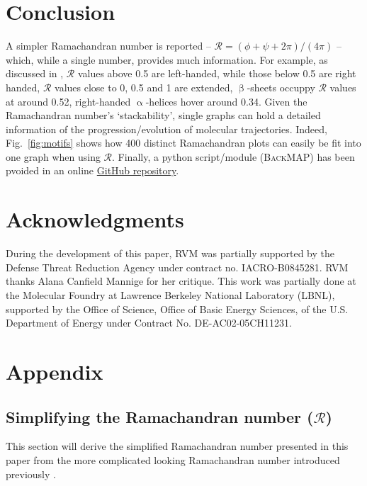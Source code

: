 \documentclass[fleqn,10pt,lineno]{wlpeerj} %
\newcommand{\Fig}[1]{Fig.~\ref{#1}}
\newcommand{\gname}{BackMAP}
\newcommand{\pname}{\textsc{\gname}\xspace}
\newcommand{\rr}{$\mathcal{R}$\xspace}
\begin{document}
\section*{Conclusion}

A simpler Ramachandran number is reported -- $\mathcal{R} = (\phi+\psi+2\pi)/(4\pi)$ -- which, while a single number, provides much information. For example, as discussed in \cite{Mannige2016}, \rr values above 0.5 are left-handed, while those below 0.5 are right handed, \rr values close to 0, 0.5 and 1 are extended, $\upbeta$-sheets occuppy \rr values at around 0.52, right-handed $\upalpha$-helices hover around 0.34. Given the Ramachandran number's `stackability', single graphs can hold a detailed information of the progression/evolution of molecular trajectories. Indeed, \Fig{fig:motifs} shows how 400 distinct Ramachandran plots can easily be fit into one graph when using \rr. Finally, a python script/module (\pname) has been pvoided in an online \href{https://github.com/ranjanmannige/\gname}{GitHub repository}.

\section*{Acknowledgments}

During the development of this paper, RVM was partially supported by the Defense Threat Reduction Agency under contract no. IACRO-B0845281. RVM thanks Alana Canfield Mannige for her critique. This work was partially done at the Molecular Foundry at Lawrence Berkeley National Laboratory (LBNL), supported by the Office of Science, Office of Basic Energy Sciences, of the U.S. Department of Energy under Contract No. DE-AC02-05CH11231.

\section{Appendix}

\subsection{Simplifying the Ramachandran number ($\mathcal{R}$)\label{sec:simplifyR}}

This section will derive the simplified Ramachandran number presented in this paper from the more complicated looking Ramachandran number introduced previously \cite{Mannige2016}. 
\end{document}
